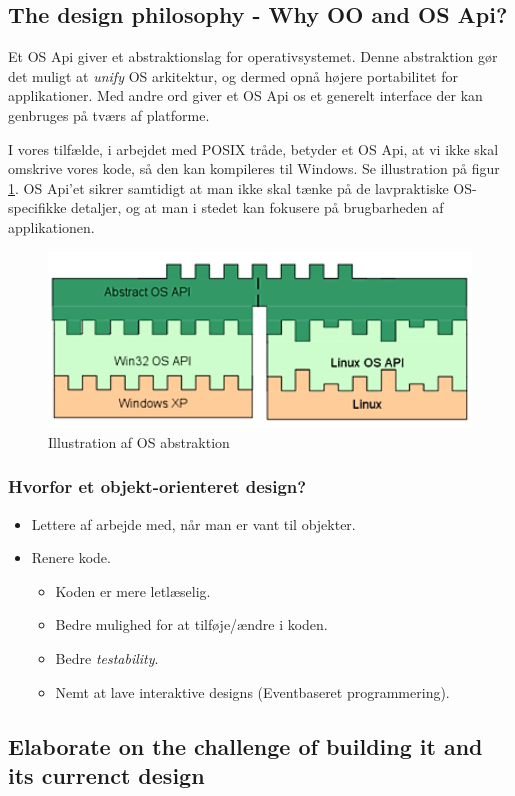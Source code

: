 \subsection{The design philosophy - Why OO and OS Api?}

Et OS Api giver et abstraktionslag for operativsystemet. Denne abstraktion gør det muligt at \textit{unify} OS arkitektur, og dermed opnå højere portabilitet for applikationer. Med andre ord giver et OS Api os et generelt interface der kan genbruges på tværs af platforme.

I vores tilfælde, i arbejdet med POSIX tråde, betyder et OS Api, at vi ikke skal omskrive vores kode, så den kan kompileres til Windows. Se illustration på figur \ref{fig:ApiModel}.
OS Api'et sikrer samtidigt at man ikke skal tænke på de lavpraktiske OS-specifikke detaljer, og at man i stedet kan fokusere på brugbarheden af applikationen.

\begin{figure}[h]
	\centering
	\includegraphics[width=0.6\linewidth]{figs/spm4/osapiModel}
	\caption{Illustration af  OS abstraktion}
	\label{fig:ApiModel}
\end{figure}

\subsubsection{Hvorfor et objekt-orienteret design?}
\begin{itemize}
	\item Lettere af arbejde med, når man er vant til objekter.
	\item Renere kode.
	\begin{itemize}
		\item Koden er mere letlæselig.
		\item Bedre mulighed for at tilføje/ændre i koden.
		\item Bedre \textit{testability}.
		\item Nemt at lave interaktive designs (Eventbaseret programmering).
	\end{itemize}
\end{itemize}

\subsection{Elaborate on the challenge of building it and its currenct design}


